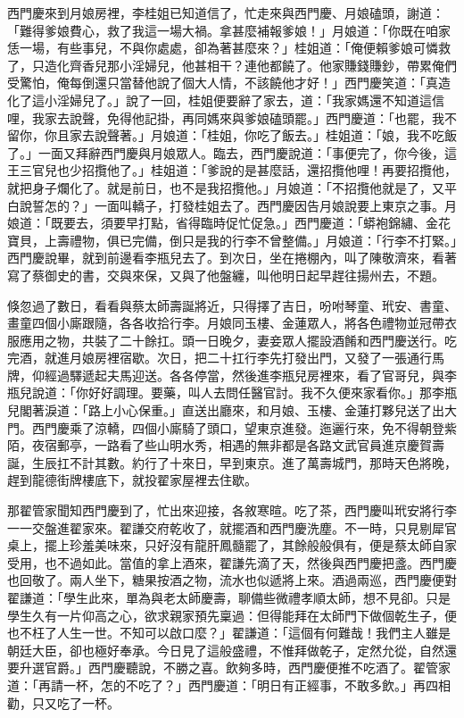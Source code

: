 西門慶來到月娘房裡，李桂姐已知道信了，忙走來與西門慶、月娘磕頭，謝道：「難得爹娘費心，救了我這一場大禍。拿甚麼補報爹娘！」月娘道：「你既在咱家恁一場，有些事兒，不與你處處，卻為著甚麼來？」桂姐道：「俺便賴爹娘可憐救了，只造化齊香兒那小淫婦兒，他甚相干？連他都饒了。他家賺錢賺鈔，帶累俺們受驚怕，俺每倒還只當替他說了個大人情，不該饒他才好！」西門慶笑道：「真造化了這小淫婦兒了。」說了一回，桂姐便要辭了家去，道：「我家媽還不知道這信哩，我家去說聲，免得他記掛，再同媽來與爹娘磕頭罷。」西門慶道：「也罷，我不留你，你且家去說聲著。」月娘道：「桂姐，你吃了飯去。」桂姐道：「娘，我不吃飯了。」一面又拜辭西門慶與月娘眾人。臨去，西門慶說道：「事便完了，你今後，這王三官兒也少招攬他了。」桂姐道：「爹說的是甚麼話，還招攬他哩！再要招攬他，就把身子爛化了。就是前日，也不是我招攬他。」月娘道：「不招攬他就是了，又平白說誓怎的？」一面叫轎子，打發桂姐去了。西門慶因告月娘說要上東京之事。月娘道：「既要去，須要早打點，省得臨時促忙促急。」西門慶道：「蟒袍錦繡、金花寶貝，上壽禮物，俱已完備，倒只是我的行李不曾整備。」月娘道：「行李不打緊。」西門慶說畢，就到前邊看李瓶兒去了。到次日，坐在捲棚內，叫了陳敬濟來，看著寫了蔡御史的書，交與來保，又與了他盤纏，叫他明日起早趕往揚州去，不題。

倏忽過了數日，看看與蔡太師壽誕將近，只得擇了吉日，吩咐琴童、玳安、書童、畫童四個小廝跟隨，各各收拾行李。月娘同玉樓、金蓮眾人，將各色禮物並冠帶衣服應用之物，共裝了二十餘扛。頭一日晚夕，妻妾眾人擺設酒餚和西門慶送行。吃完酒，就進月娘房裡宿歇。次日，把二十扛行李先打發出門，又發了一張通行馬牌，仰經過驛遞起夫馬迎送。各各停當，然後進李瓶兒房裡來，看了官哥兒，與李瓶兒說道：「你好好調理。要藥，叫人去問任醫官討。我不久便來家看你。」那李瓶兒閣著淚道：「路上小心保重。」直送出廳來，和月娘、玉樓、金蓮打夥兒送了出大門。西門慶乘了涼轎，四個小廝騎了頭口，望東京進發。迤邐行來，免不得朝登紫陌，夜宿郵亭，一路看了些山明水秀，相遇的無非都是各路文武官員進京慶賀壽誕，生辰扛不計其數。約行了十來日，早到東京。進了萬壽城門，那時天色將晚，趕到龍德街牌樓底下，就投翟家屋裡去住歇。

那翟管家聞知西門慶到了，忙出來迎接，各敘寒暄。吃了茶，西門慶叫玳安將行李一一交盤進翟家來。翟謙交府乾收了，就擺酒和西門慶洗塵。不一時，只見剔犀官桌上，擺上珍羞美味來，只好沒有龍肝鳳髓罷了，其餘般般俱有，便是蔡太師自家受用，也不過如此。當值的拿上酒來，翟謙先滴了天，然後與西門慶把盞。西門慶也回敬了。兩人坐下，糖果按酒之物，流水也似遞將上來。酒過兩巡，西門慶便對翟謙道：「學生此來，單為與老太師慶壽，聊備些微禮孝順太師，想不見卻。只是學生久有一片仰高之心，欲求親家預先稟過：但得能拜在太師門下做個乾生子，便也不枉了人生一世。不知可以啟口麼？」翟謙道：「這個有何難哉！我們主人雖是朝廷大臣，卻也極好奉承。今日見了這般盛禮，不惟拜做乾子，定然允從，自然還要升選官爵。」西門慶聽說，不勝之喜。飲夠多時，西門慶便推不吃酒了。翟管家道：「再請一杯，怎的不吃了？」西門慶道：「明日有正經事，不敢多飲。」再四相勸，只又吃了一杯。

